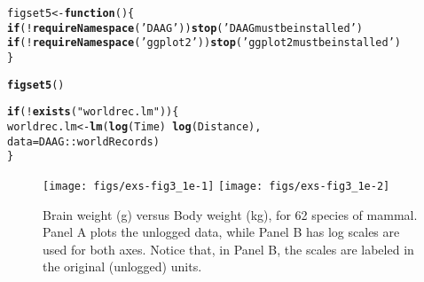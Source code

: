 \documentclass[12pt, a4paper,  BCOR=8.25mm, DIV=15]{scrartcl}\usepackage[]{graphicx}\usepackage[]{color}
\makeatletter
\newcommand{\hlstr}[1]{\textcolor[rgb]{0.192,0.494,0.8}{#1}}%
\newcommand{\hlopt}[1]{\textcolor[rgb]{0,0,0}{#1}}%
\newcommand{\hlstd}[1]{\textcolor[rgb]{0.345,0.345,0.345}{#1}}%
\newcommand{\hlkwa}[1]{\textcolor[rgb]{0.161,0.373,0.58}{\textbf{#1}}}%
\newcommand{\hlkwb}[1]{\textcolor[rgb]{0.69,0.353,0.396}{#1}}%
\newcommand{\hlkwc}[1]{\textcolor[rgb]{0.333,0.667,0.333}{#1}}%
\newcommand{\hlkwd}[1]{\textcolor[rgb]{0.737,0.353,0.396}{\textbf{#1}}}%
\newenvironment{kframe}{%
 \def\at@end@of@kframe{}%
 \ifinner\ifhmode%
  \def\at@end@of@kframe{\end{minipage}}%
  \begin{minipage}{\columnwidth}%
 \fi\fi%
 \def\FrameCommand##1{\hskip\@totalleftmargin \hskip-\fboxsep
 \colorbox{shadecolor}{##1}\hskip-\fboxsep
     \hskip-\linewidth \hskip-\@totalleftmargin \hskip\columnwidth}%
 \MakeFramed {\advance\hsize-\width
   \@totalleftmargin\z@ \linewidth\hsize
   \@setminipage}}%
 {\par\unskip\endMakeFramed%
 \at@end@of@kframe}
\newenvironment{knitrout}{}{} %
\makeatother
\begin{document}
\begin{knitrout}
\color{fgcolor}\begin{kframe}
\begin{alltt}
\hlstd{figset5} \hlkwb{<-} \hlkwa{function}\hlstd{()\{}
    \hlkwa{if}\hlstd{(}\hlopt{!}\hlkwd{requireNamespace}\hlstd{(}\hlstr{'DAAG'}\hlstd{))}\hlkwd{stop}\hlstd{(}\hlstr{'DAAG must be installed'}\hlstd{)}
  \hlkwa{if}\hlstd{(}\hlopt{!}\hlkwd{requireNamespace}\hlstd{(}\hlstr{'ggplot2'}\hlstd{))}\hlkwd{stop}\hlstd{(}\hlstr{'ggplot2 must be installed'}\hlstd{)}
  \hlstd{\}}
\end{alltt}
\end{kframe}
\end{knitrout}

\begin{knitrout}
\color{fgcolor}\begin{kframe}
\begin{alltt}
\hlkwd{figset5}\hlstd{()}
\end{alltt}


{\ttfamily\noindent\itshape\color{messagecolor}{Loading required namespace: DAAG}}

{\ttfamily\noindent\itshape\color{messagecolor}{Loading required namespace: ggplot2}}\begin{alltt}
\hlkwa{if}\hlstd{(}\hlopt{!}\hlkwd{exists}\hlstd{(}\hlstr{"worldrec.lm"}\hlstd{))\{}
    \hlstd{worldrec.lm} \hlkwb{<-} \hlkwd{lm}\hlstd{(}\hlkwd{log}\hlstd{(Time)} \hlopt{~} \hlkwd{log}\hlstd{(Distance),}
                      \hlkwc{data}\hlstd{=DAAG}\hlopt{::}\hlstd{worldRecords)}
\hlstd{\}}
\end{alltt}
\end{kframe}
\end{knitrout}


\begin{figure}
\begin{knitrout}
\color{fgcolor}

{\centering \texttt{[image: figs/exs-fig3\_1e-1]} 
\texttt{[image: figs/exs-fig3\_1e-2]} 

}



\end{knitrout}
\caption{Brain weight (g) versus Body weight (kg), for 62 species of mammal.
Panel A plots the unlogged data, while Panel B has log scales are used for
both axes. Notice that, in Panel B, the scales are
  labeled in the original (unlogged) units.
  \label{fig:Animals}}
\end{figure}
\end{document}
